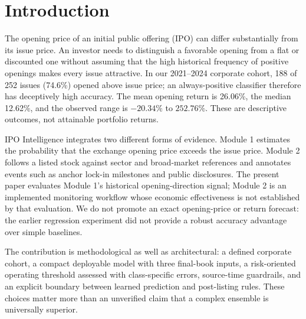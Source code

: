\documentclass[runningheads]{llncs}
\begin{document}
\section{Introduction}
The opening price of an initial public offering (IPO) can differ substantially from its issue price. An investor needs to distinguish a favorable opening from a flat or discounted one without assuming that the high historical frequency of positive openings makes every issue attractive. In our 2021--2024 corporate cohort, 188 of 252 issues (74.6\%) opened above issue price; an always-positive classifier therefore has deceptively high accuracy. The mean opening return is 26.06\%, the median 12.62\%, and the observed range is $-20.34\%$ to $252.76\%$. These are descriptive outcomes, not attainable portfolio returns.

IPO Intelligence integrates two different forms of evidence. Module 1 estimates the probability that the exchange opening price exceeds the issue price. Module 2 follows a listed stock against sector and broad-market references and annotates events such as anchor lock-in milestones and public disclosures. The present paper evaluates Module 1's historical opening-direction signal; Module 2 is an implemented monitoring workflow whose economic effectiveness is not established by that evaluation. We do not promote an exact opening-price or return forecast: the earlier regression experiment did not provide a robust accuracy advantage over simple baselines.

The contribution is methodological as well as architectural: a defined corporate cohort, a compact deployable model with three final-book inputs, a risk-oriented operating threshold assessed with class-specific errors, source-time guardrails, and an explicit boundary between learned prediction and post-listing rules. These choices matter more than an unverified claim that a complex ensemble is universally superior.
\end{document}
